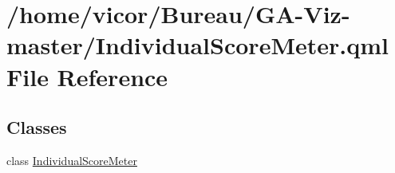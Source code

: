 \hypertarget{_individual_score_meter_8qml}{}\section{/home/vicor/\+Bureau/\+G\+A-\/\+Viz-\/master/\+Individual\+Score\+Meter.qml File Reference}
\label{_individual_score_meter_8qml}
\subsection*{Classes}
\begin{DoxyCompactItemize}
\item 
class \hyperlink{class_individual_score_meter}{Individual\+Score\+Meter}
\end{DoxyCompactItemize}
